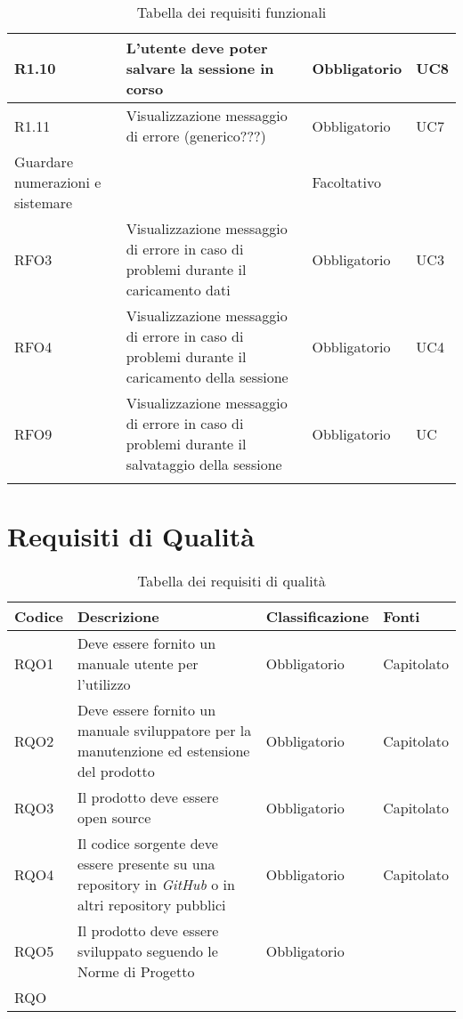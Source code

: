 \begin{table}[H]
\begin{tabular}{|p{}|p{6cm}|p{3cm}|p{2cm}|}
    \rowcolor[HTML]{C0C0C0}
    R1.10 & L'utente deve poter salvare la sessione in corso & Obbligatorio & UC8 \\ \hline
    \rowcolor[HTML]{EFEFEF}
    R1.11 & Visualizzazione messaggio di errore (generico???) & Obbligatorio & UC7 \\ \hline
    \rowcolor[HTML]{C0C0C0}
    Guardare numerazioni e sistemare &  & Facoltativo &  \\ \hline
    \rowcolor[HTML]{EFEFEF}
    RFO3 & Visualizzazione messaggio di errore in caso di problemi durante il caricamento dati & Obbligatorio & UC3 \\ \hline
    \rowcolor[HTML]{C0C0C0}
    RFO4 & Visualizzazione messaggio di errore in caso di problemi durante il caricamento della sessione & Obbligatorio & UC4 \\ \hline
    \rowcolor[HTML]{EFEFEF}
    RFO9 & Visualizzazione messaggio di errore in caso di problemi durante il salvataggio della sessione & Obbligatorio & UC \\ \hline
    \rowcolor[HTML]{C0C0C0}
     &  &  & \\ \hline
  \end{tabular}
  \caption{Tabella dei requisiti funzionali}
\end{table}

\section{Requisiti di Qualità}
\begin{table}[H]
  \centering
  \begin{tabular}{|p{}|p{6cm}|p{3cm}|p{2cm}|}
    \hline
    \rowcolor[HTML]{036400}
    {\color[HTML]{FFFFFF} \textbf{Codice}} & {\color[HTML]{FFFFFF} \textbf{Descrizione}} & {\color[HTML]{FFFFFF} \textbf{Classificazione}} & {\color[HTML]{FFFFFF} \textbf{Fonti}} \\ \hline
    \rowcolor[HTML]{EFEFEF}
    RQO1 & Deve essere fornito un manuale utente per l'utilizzo & Obbligatorio & Capitolato \\ \hline
    \rowcolor[HTML]{C0C0C0}
    RQO2 & Deve essere fornito un manuale sviluppatore per la manutenzione ed estensione del prodotto & Obbligatorio & Capitolato \\ \hline
    \rowcolor[HTML]{EFEFEF}
    RQO3 & Il prodotto deve essere open source & Obbligatorio & Capitolato \\ \hline
    \rowcolor[HTML]{C0C0C0}
    RQO4 & Il codice sorgente deve essere presente su una repository in \textit{GitHub} o in altri repository pubblici & Obbligatorio & Capitolato \\ \hline
    \rowcolor[HTML]{EFEFEF}
    RQO5 & Il prodotto deve essere sviluppato seguendo le Norme di Progetto & Obbligatorio &  \\ \hline
    \rowcolor[HTML]{C0C0C0}
    RQO &  &  &  \\ \hline
  \end{tabular}
  \caption{Tabella dei requisiti di qualità}
\end{table}

